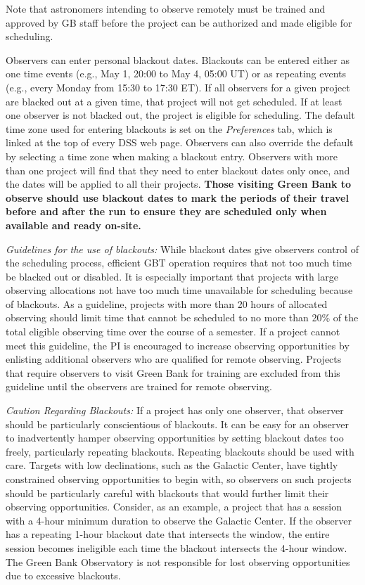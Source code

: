 Note that astronomers intending to observe remotely must be trained and approved by
GB staff before the project can be authorized and made eligible for scheduling.

Observers can enter personal blackout dates. Blackouts can be entered either as one time
events (e.g., May 1, 20:00 to May 4, 05:00 UT) or as repeating events (e.g., every
Monday from 15:30 to 17:30 ET). If all observers for a given project are blacked out at a
given time, that project will not get scheduled. If at least one observer is not blacked out,
the project is eligible for scheduling. The default time zone used for entering blackouts is
set on the {\it Preferences} tab, which is linked at the top of every \gls{DSS} web page. Observers
can also override the default by selecting a time zone when making a blackout entry.
Observers with more than one project will find that they need to enter blackout dates only
once, and the dates will be applied to all their projects. {\bf Those visiting Green Bank to
observe should use blackout dates to mark the periods of their travel before and after the
run to ensure they are scheduled only when available and ready on-site.}

{\it Guidelines for the use of blackouts:} While blackout dates give observers control of the
scheduling process, efficient \gls{GBT} operation requires that not too much time be blacked
out or disabled. It is especially important that projects with large observing allocations
not have too much time unavailable for scheduling because of blackouts. As a guideline,
projects with more than 20 hours of allocated observing should limit time that cannot be
scheduled to no more than 20\% of the total eligible observing time over the course of a
semester. If a project cannot meet this guideline, the \gls{PI} is encouraged
to increase observing opportunities by enlisting additional observers who are qualified for
remote observing. Projects that require observers to visit Green Bank for training are excluded
from this guideline until the observers are trained for remote observing.

{\it Caution Regarding Blackouts:} If a project has only one observer, that observer should be
particularly conscientious of blackouts. It can be easy for an observer to inadvertently
hamper observing opportunities by setting blackout dates too freely,
particularly repeating blackouts. Repeating blackouts should be used with care.
Targets with low declinations, such as the Galactic Center, have tightly constrained
observing opportunities to begin with, so observers on such projects
should be particularly careful with blackouts that would further limit their observing
opportunities. Consider, as an example, a project that has a session with a 4-hour
minimum duration to observe the Galactic Center. If the observer has a repeating 1-hour
blackout date that intersects the window, the entire session becomes ineligible each time
the blackout intersects the 4-hour window.  The Green Bank Observatory is not responsible
for lost observing opportunities due to excessive blackouts.

